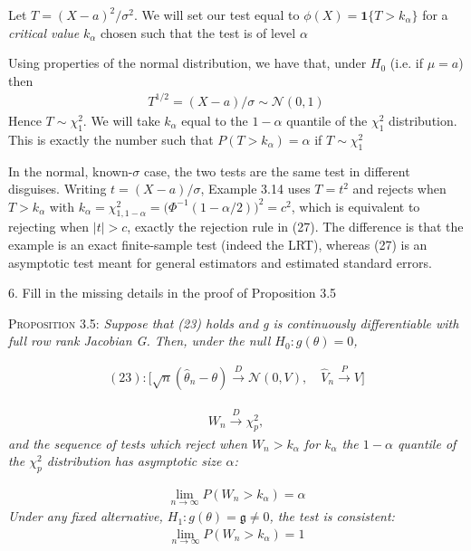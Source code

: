 \documentclass[10pt]{article}
\begin{document}
Let $T = (X - a)^2 / \sigma^2 $. We will set our test equal to $\phi(X) = \mathbf{1}\{T > k_\alpha\}$ for a \textit{critical value }$k_\alpha $ chosen such that the test is of level $\alpha $

Using properties of the normal distribution, we have that, under $H_0 $ (i.e. if $\mu = a $) then 
\begin{gather*}
    T^{1 / 2} = (X - a) / \sigma \sim \mathcal{N}(0, 1)
\end{gather*}
Hence $T \sim\chi_1^2 $. We will take $k_\alpha $ equal to the $1 - \alpha $ quantile of the $\chi_1^2 $ distribution. This is exactly the number such that $P(T > k_\alpha) = \alpha $ if $T \sim\chi_1^2 $

In the normal, known-$\sigma $ case, the two tests are the same test in different disguises. Writing $t = (X - a) / \sigma $, Example 3.14 uses $T = t^2 $ and rejects when $T > k_\alpha $ with $k_\alpha = \chi_{1, 1-\alpha}^2 = \big(\Phi^{-1}(1 - \alpha / 2)\big)^2 = c^2 $, which is equivalent to rejecting when $|t| > c $, exactly the rejection rule in (27). The difference is that the example is an exact finite-sample test (indeed the LRT), whereas (27) is an asymptotic test meant for general estimators and estimated standard errors. 

\newpage 

6. Fill in the missing details in the proof of Proposition 3.5

\textsc{Proposition 3.5}: \textit{Suppose that (23) holds and g is continuously differentiable with full row rank Jacobian G. Then, under the null $H_0 : g(\theta) = 0 $,}


\begin{gather*}
    (23): \Bigg[ \sqrt{n}(\hat{\theta}_n - \theta) \xrightarrow{D}\mathcal{N}(0, V), \quad \hat{V}_n\xrightarrow{P}V\Bigg]
\end{gather*}

\begin{gather*}
    W_n\xrightarrow{D}\chi_p^2,
\end{gather*}
\textit{and the sequence of tests which reject when $W_n > k_\alpha $ for $k_\alpha $ the $1 - \alpha $ quantile of the $\chi_p^2 $ distribution has asymptotic size $\alpha $:}

\begin{gather*}
    \lim_{n\to\infty}P(W_n > k_\alpha) = \alpha
\end{gather*}
\textit{Under any fixed alternative, $H_1 : g(\theta) = \mathfrak{g}\neq 0 $, the test is consistent:}
\begin{gather*}
    \lim_{n\to\infty}P(W_n > k_\alpha) = 1
\end{gather*}
\end{document}
